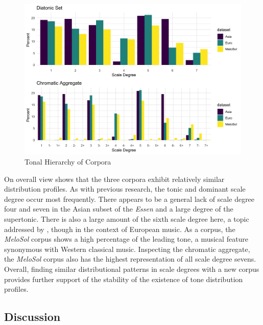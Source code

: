 \documentclass[]{book}
\begin{document}
\begin{figure}

{\centering \includegraphics[width=1\linewidth]{img/krum_panel} 

}

\caption{Tonal Hierarchy of Corpora}\label{fig:krum}
\end{figure}

On overall view shows that the three corpora exhibit relatively similar distribution profiles.
As with previous research, the tonic and dominant scale degree occur most frequently.
There appears to be a general lack of scale degree four and seven in the Asian subset of the \emph{Essen} and a large degree of the supertonic.
There is also a large amount of the sixth scale degree here, a topic addressed by \citet{brinkmanLeadingSixthScale2018}, though in the context of European music.
As a corpus, the \emph{MeloSol} corpus shows a high percentage of the leading tone, a musical feature synonymous with Western classical music.
Inspecting the chromatic aggregate, the \emph{MeloSol} corpus also has the highest representation of all scale degree sevens.
Overall, finding similar distributional patterns in scale degrees with a new corpus provides further support of the stability of the existence of tone distribution profiles.

\hypertarget{discussion-1}{%
\subsection{Discussion}\label{discussion-1}}
\end{document}
